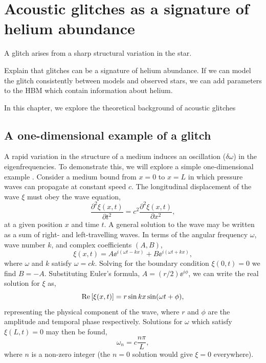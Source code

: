 %
%
%
%
%
\chapter[Acoustic glitches]{Acoustic glitches as a signature of helium abundance}\label{chap:glitch}

A glitch arises from a sharp structural variation in the star.

Explain that glitches can be a signature of helium abundance. If we can model the glitch consistently between models and observed stars, we can add parameters to the HBM which contain information about helium.

In this chapter, we explore the theoretical background of acoustic glitches

\section[1D example]{A one-dimensional example of a glitch}\label{sec:1d-glitch}

A rapid variation in the structure of a medium induces an oscillation (\(\delta\omega\)) in the eigenfrequencies. To demonstrate this, we will explore a simple one-dimensional example \citep[e.g][]{Verner2005}. Consider a medium bound from \(x=0\) to \(x=L\) in which pressure waves can propagate at constant speed \(c\). The longitudinal displacement of the wave \(\xi\) must obey the wave equation,
%
\begin{equation}
    \frac{\partial^2\xi(x, t)}{\partial t^2} = c^2 \frac{\partial^2\xi(x, t)}{\partial x^2},
\end{equation}
%
at a given position \(x\) and time \(t\). A general solution to the wave may be written as a sum of right- and left-travelling waves. In terms of the angular frequency \(\omega\), wave number \(k\), and complex coefficients \((A, B)\),
%
\begin{equation}
    \xi(x, t) = A \ee^{i (\omega t - k x)} + B \ee^{i (\omega t + k x)},
\end{equation}
%
where \(\omega\) and \(k\) satisfy \(\omega = c k\). Solving for the boundary condition \(\xi(0, t) = 0\) we find \(B = - A\). Substituting Euler's formula, \(A = (r/2) \ee^{i\phi}\), we can write the real solution for \(\xi\) as,
%
\begin{equation}
    {\mathrm{Re}}\left[\xi(x, t)\right] = r \sin k x \sin(\omega t + \phi),
\end{equation}
%
representing the physical component of the wave, where \(r\) and \(\phi\) are the amplitude and temporal phase respectively. Solutions for \(\omega\) which satisfy \(\xi(L, t)=0\) may then be found,
%
\begin{equation}
    \omega_n = c \frac{n \pi}{L}, \label{eq:omega-n}
\end{equation}
%
where \(n\) is a non-zero integer (the \(n=0\) solution would give \(\xi=0\) everywhere).

